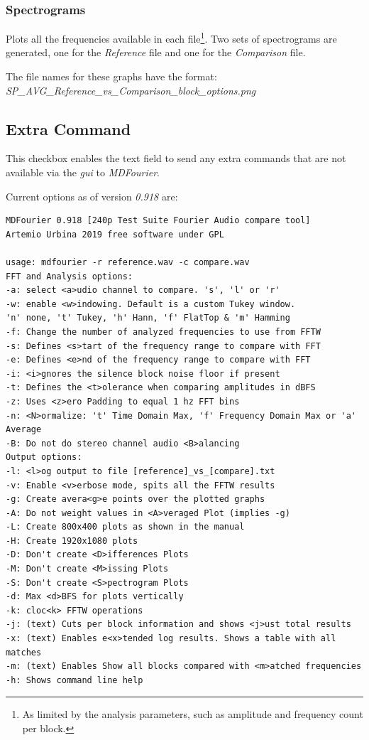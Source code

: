 \documentclass[10pt,a4paper]{report}
\newcommand{\ac}[1]{\textit{\acrshort{#1}}}
\begin{document}
\begin{appendices}
\subsubsection{Spectrograms}

Plots all the frequencies available in each file\footnote{As limited by the analysis parameters, such as amplitude and frequency count per block.}. Two sets of spectrograms are generated, one for the \textit{Reference} file and one for the \textit{Comparison} file.

The file names for these graphs have the format:\\ \textit{SP\_AVG\_Reference\_vs\_Comparison\_block\_options.png}

\subsection{Extra Command}
\label{extracommand}

This checkbox enables the text field to send any extra commands that are not available via the \ac{gui} to \textit{MDFourier}. 

Current options as of version \textit{0.918} are:

\begin{verbatim}
MDFourier 0.918 [240p Test Suite Fourier Audio compare tool]
Artemio Urbina 2019 free software under GPL

usage: mdfourier -r reference.wav -c compare.wav
FFT and Analysis options:
-a: select <a>udio channel to compare. 's', 'l' or 'r'
-w: enable <w>indowing. Default is a custom Tukey window.
'n' none, 't' Tukey, 'h' Hann, 'f' FlatTop & 'm' Hamming
-f: Change the number of analyzed frequencies to use from FFTW
-s: Defines <s>tart of the frequency range to compare with FFT
-e: Defines <e>nd of the frequency range to compare with FFT
-i: <i>gnores the silence block noise floor if present
-t: Defines the <t>olerance when comparing amplitudes in dBFS
-z: Uses <z>ero Padding to equal 1 hz FFT bins
-n: <N>ormalize: 't' Time Domain Max, 'f' Frequency Domain Max or 'a' Average
-B: Do not do stereo channel audio <B>alancing
Output options:
-l: <l>og output to file [reference]_vs_[compare].txt
-v: Enable <v>erbose mode, spits all the FFTW results
-g: Create avera<g>e points over the plotted graphs
-A: Do not weight values in <A>veraged Plot (implies -g)
-L: Create 800x400 plots as shown in the manual
-H: Create 1920x1080 plots
-D: Don't create <D>ifferences Plots
-M: Don't create <M>issing Plots
-S: Don't create <S>pectrogram Plots
-d: Max <d>BFS for plots vertically
-k: cloc<k> FFTW operations
-j: (text) Cuts per block information and shows <j>ust total results
-x: (text) Enables e<x>tended log results. Shows a table with all matches
-m: (text) Enables Show all blocks compared with <m>atched frequencies
-h: Shows command line help
\end{verbatim}


\end{appendices}
\end{document}
